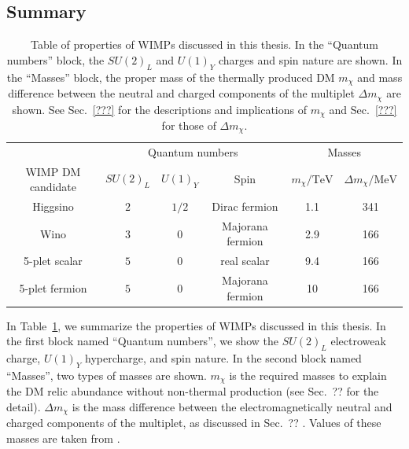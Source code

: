 \documentclass[12pt,twoside,book]{article}
\begin{document}


\subsection{Summary}

\begin{table}
  \centering
  \begin{tabular}{c|ccc|cc}
    & \multicolumn{3}{c|}{Quantum numbers} & \multicolumn{2}{c}{Masses}\\
    WIMP DM candidate & $SU(2)_L$ & $U(1)_Y$ & Spin & $m_\chi / \mathrm{TeV}$ &
    $\Delta m_\chi / \mathrm{MeV}$ \\
    \hline
    Higgsino & $2$ & $1/2$ & Dirac fermion & 1.1 & 341 \\
    Wino & $3$ & $0$ & Majorana fermion & 2.9 & 166 \\
    5-plet scalar & $5$ & $0$ & real scalar & 9.4 & 166 \\
    5-plet fermion & $5$ & $0$ & Majorana fermion & 10 & 166
  \end{tabular}
  \caption{
    Table of properties of WIMPs discussed in this thesis.
    In the ``Quantum numbers'' block, the $SU(2)_L$ and $U(1)_Y$ charges and spin nature are shown.
    In the ``Masses'' block, the proper mass of the thermally produced DM $m_\chi$ and mass difference between the neutral and charged components of the multiplet $\Delta m_\chi$ are shown.
    See Sec.~\ref{???}  for the descriptions and implications of $m_\chi$ and Sec.~\ref{???}  for those of $\Delta m_\chi$.
  }
  \label{tab:WIMP_property}
\end{table}

In Table~\ref{tab:WIMP_property}, we summarize the properties of WIMPs discussed in this thesis.
In the first block named ``Quantum numbers'', we show the $SU(2)_L$ electroweak charge, $U(1)_Y$ hypercharge, and spin nature.
In the second block named ``Masses'', two types of masses are shown.
$m_\chi$ is the required masses to explain the DM relic abundance without non-thermal production (see Sec.~??  for the detail).
$\Delta m_\chi$ is the mass difference between the electromagnetically neutral and charged components of the multiplet, as discussed in Sec.~?? .
Values of these masses are taken from \cite{Farina:2013mla, ArkaniHamed:2006mb, Hisano:2006nn,  Cirelli:2007xd, Moroi:2013sla, Beneke:2016ync}.




\end{document}
